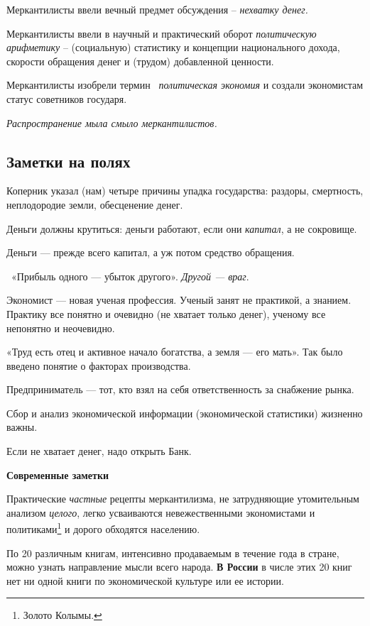 Меркантилисты ввели вечный предмет обсуждения – \textit{нехватку денег.}

Меркантилисты ввели в научный и практический оборот \textit{политическую арифметику} – (социальную) статистику и
концепции национального дохода, скорости обращения денег и (трудом) добавленной ценности.

Меркантилисты изобрели термин \textit{\ политическая экономия} и создали экономистам статус советников государя.

{\itshape Распространение мыла смыло меркантилистов.}

\subsection[Заметки на полях]{Заметки на полях}
Коперник указал (нам) четыре причины упадка государства: раздоры, смертность, неплодородие земли, обесценение денег.

Деньги должны крутиться: деньги работают, если они \textit{капитал}, а не сокровище.

Деньги — прежде всего капитал, а уж потом средство обращения.

\ «Прибыль одного — убыток другого». \textit{Другой — враг}.

Экономист — новая ученая профессия. Ученый занят не практикой, а знанием. Практику все понятно и очевидно (не хватает
только денег), ученому все непонятно и неочевидно.

«Труд есть отец и активное начало богатства, а земля — его мать». Так было введено понятие о факторах производства.

Предприниматель — тот, кто взял на себя ответственность за снабжение рынка.

Сбор и анализ экономической информации (экономической статистики) жизненно важны.

Если не хватает денег, надо открыть Банк.

{\bfseries
Современные заметки}

Практические \textit{частные} рецепты меркантилизма, не затрудняющие утомительным анализом \textit{целого}, легко
усваиваются невежественными экономистами и политиками\footnote{Золото Колымы.} и дорого обходятся
населению.

По 20 различным книгам, интенсивно продаваемым в течение года в стране, можно узнать направление мысли всего народа.
\textbf{В России }в числе этих 20 книг нет ни одной книги по экономической культуре или ее истории.

